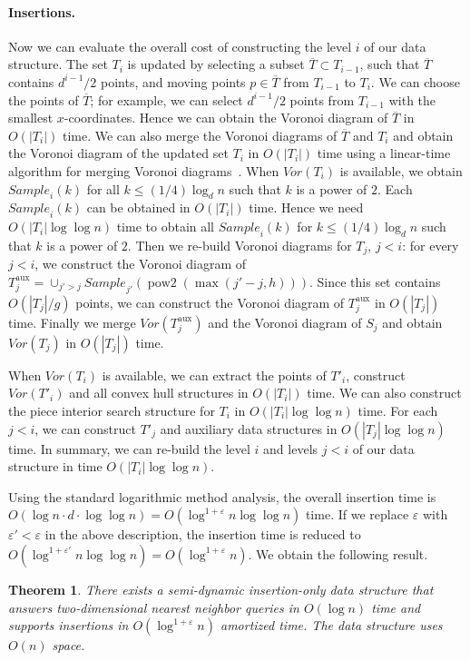 \documentclass[10pt,a4paper]{amsart}
\newcommand{\Sample}{\mathit{Sample}}
\newcommand{\oT}{\overline{T}}
\newcommand{\Voron}{\mathit{Vor}}
\newcommand{\eps}{\varepsilon}
\newtheorem{theorem}{Theorem}
\begin{document}
\paragraph*{Insertions.}
Now we can evaluate the overall cost of constructing the level $i$ of our data structure. The set $T_i$ is updated by selecting a subset $\oT\subset T_{i-1}$, such that $\oT$ contains $d^{i-1}/2$ points, and moving  points  $p\in \oT$ from $T_{i-1}$ to $T_i$.  We can choose the points of $\oT$; for example, we can select $d^{i-1}/2$ points from $T_{i-1}$ with the smallest $x$-coordinates. Hence we can obtain the Voronoi diagram of $\oT$ in $O(|T_i|)$ time. We can also merge the Voronoi diagrams of $\oT$ and $T_i$ and obtain the Voronoi diagram of the updated set $T_i$ in $O(|T_i|)$ time using a linear-time  algorithm for merging Voronoi diagrams~\cite{Kirkpatrick79,Chazelle92}. When $\Voron(T_i)$ is available, we obtain $\Sample_i(k)$ for all $k\le (1/4)\log_d n$ such that $k$ is a power of $2$. Each $\Sample_i(k)$ can be obtained in $O(|T_i|)$ time. Hence we need $O(|T_i|\log\log n)$ time to obtain all $\Sample_i(k)$ for  $k\le (1/4)\log_d n$ such that $k$ is a power of $2$.  Then we re-build Voronoi diagrams for $T_j$, $j<i$: for every $j<i$, we construct the Voronoi diagram of $T^{\mathrm{aux}}_j=\cup_{j'>j} \Sample_{j'}(\operatorname{pow2}(\max(j'-j,h)))$. Since this set contains $O(|T_j|/g)$ points, we can construct the Voronoi diagram of $T^{\mathrm{aux}}_j$ in $O(|T_j|)$ time. Finally we merge  $\Voron(T^{\mathrm{aux}}_j)$  and the Voronoi diagram of $S_j$  and obtain $\Voron(T_j)$ in $O(|T_j|)$ time.

When $\Voron(T_i)$ is available, we can extract the points of $T'_i$, construct $\Voron(T'_i)$ and all convex hull structures in $O(|T_i|)$ time. We can also construct the piece interior search structure for $T_i$ in $O(|T_i|\log\log n)$ time. For each
$j<i$, we can construct $T'_j$ and auxiliary data structures in $O(|T_j|\log \log n)$ time. In summary, we can re-build the level $i$ and levels $j<i$ of our data structure in time $O(|T_i|\log\log n)$.


Using the standard logarithmic method analysis, the overall insertion time is $O(\log n\cdot d \cdot \log\log n)=O(\log^{1+\eps}n\log\log n)$ time. If we replace $\eps$ with $\eps'<\eps$ in the above description,  the insertion time is reduced to $O(\log^{1+\eps'}n\log\log n)=O(\log^{1+\eps}n)$. We obtain the following result.

\begin{theorem}
  \label{theor:semidyn2}
  There exists a semi-dynamic insertion-only  data structure that answers two-dimensional nearest neighbor queries in $O(\log n)$ time and supports insertions  in $O(\log^{1+\eps} n)$ amortized time.  The data structure uses $O(n)$ space. 
\end{theorem}
\end{document}

